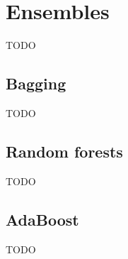 \section{Ensembles}

TODO

\subsection{Bagging}

TODO

\subsection{Random forests}

TODO

\subsection{AdaBoost}

TODO
